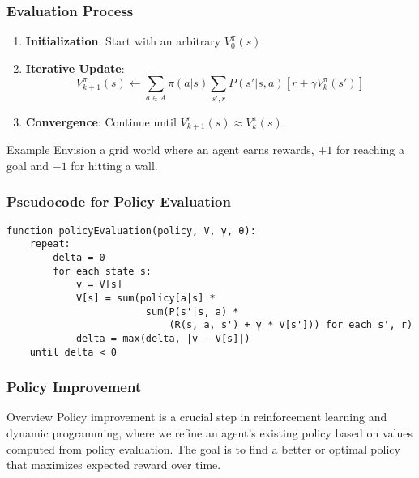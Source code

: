 \documentclass[aspectratio=169]{beamer}
\begin{document}
\begin{frame}[fragile]
    \frametitle{Evaluation Process}
    \begin{enumerate}
        \item \textbf{Initialization}: Start with an arbitrary \(V^{\pi}_0(s)\).
        
        \item \textbf{Iterative Update}:
        \begin{equation}
        V^{\pi}_{k+1}(s) \leftarrow \sum_{a \in A} \pi(a|s) \sum_{s', r} P(s'|s, a) [r + \gamma V^{\pi}_k(s')]
        \end{equation}
        
        \item \textbf{Convergence}: Continue until \(V^{\pi}_{k+1}(s) \approx V^{\pi}_k(s)\).
    \end{enumerate}

    \begin{block}{Example}
        Envision a grid world where an agent earns rewards, \(+1\) for reaching a goal and \(-1\) for hitting a wall.
    \end{block}
\end{frame}

\begin{frame}[fragile]
    \frametitle{Pseudocode for Policy Evaluation}
    \begin{lstlisting}[language=pseudocode]
function policyEvaluation(policy, V, γ, θ):
    repeat:
        delta = 0
        for each state s:
            v = V[s]
            V[s] = sum(policy[a|s] * 
                        sum(P(s'|s, a) * 
                            (R(s, a, s') + γ * V[s'])) for each s', r)
            delta = max(delta, |v - V[s]|)
    until delta < θ
    \end{lstlisting}
\end{frame}

\begin{frame}[fragile]
  \frametitle{Policy Improvement}
  \begin{block}{Overview}
    Policy improvement is a crucial step in reinforcement learning and dynamic programming, where we refine an agent's existing policy based on values computed from policy evaluation. The goal is to find a better or optimal policy that maximizes expected reward over time.
  \end{block}
\end{frame}
\end{document}

